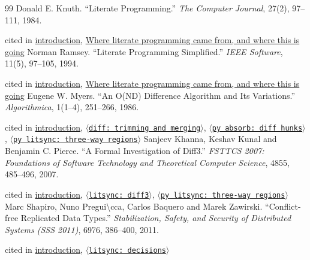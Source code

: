 \documentclass[10pt,a4paper]{article}
\newcounter{chunk}
\newcommand{\chunkname}[1]{\ensuremath{\langle}\texttt{#1}\ensuremath{\rangle}}
\begin{document}
\clearpage
{}
\renewcommand{\refname}{Bibliography}
\begin{thebibliography}{99}
 Donald E. Knuth. ``Literate Programming.'' \emph{The Computer Journal}, 27(2), 97–111, 1984.
\par{\footnotesize\color{tuftegray}cited in \hyperlink{h-lit-a-literate-program-that-tangles-itself}{introduction}, \hyperlink{h-Where-literate-programming-came-from-and-where-this-is-going}{Where literate programming came from, and where this is going}}
 Norman Ramsey. ``Literate Programming Simplified.'' \emph{IEEE Software}, 11(5), 97–105, 1994.
\par{\footnotesize\color{tuftegray}cited in \hyperlink{h-lit-a-literate-program-that-tangles-itself}{introduction}, \hyperlink{h-Where-literate-programming-came-from-and-where-this-is-going}{Where literate programming came from, and where this is going}}
 Eugene W. Myers. ``An O(ND) Difference Algorithm and Its Variations.'' \emph{Algorithmica}, 1(1--4), 251–266, 1986.
\par{\footnotesize\color{tuftegray}cited in \hyperlink{h-lit-a-literate-program-that-tangles-itself}{introduction}, \hyperref[chunk172]{\chunkname{diff: trimming and merging}}, \hyperref[chunk212]{\chunkname{py absorb: diff hunks}}, \hyperref[chunk233]{\chunkname{py litsync: three-way regions}}}
 Sanjeev Khanna, Keshav Kunal and Benjamin C. Pierce. ``A Formal Investigation of Diff3.'' \emph{FSTTCS 2007: Foundations of Software Technology and Theoretical Computer Science}, 4855, 485–496, 2007.
\par{\footnotesize\color{tuftegray}cited in \hyperlink{h-lit-a-literate-program-that-tangles-itself}{introduction}, \hyperref[chunk50]{\chunkname{litsync: diff3}}, \hyperref[chunk233]{\chunkname{py litsync: three-way regions}}}
 Marc Shapiro, Nuno Pregui\textbackslash{}cca, Carlos Baquero and Marek Zawirski. ``Conflict-free Replicated Data Types.'' \emph{Stabilization, Safety, and Security of Distributed Systems (SSS 2011)}, 6976, 386–400, 2011.
\par{\footnotesize\color{tuftegray}cited in \hyperlink{h-lit-a-literate-program-that-tangles-itself}{introduction}, \hyperref[chunk44]{\chunkname{litsync: decisions}}}
\end{thebibliography}
\end{document}
